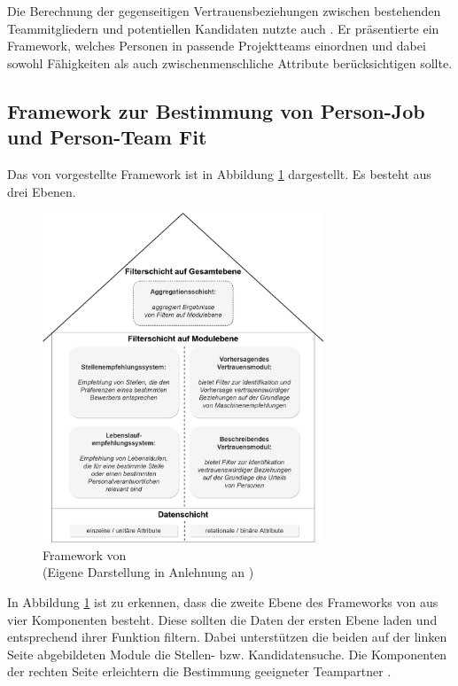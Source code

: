 Die Berechnung der gegenseitigen Vertrauensbeziehungen zwischen bestehenden Teammitgliedern und potentiellen Kandidaten nutzte auch \textcite[S. 1ff.]{keim:2007}. Er präsentierte ein Framework, welches Personen in passende Projektteams einordnen und dabei sowohl Fähigkeiten als auch zwischenmenschliche Attribute berücksichtigen sollte.

\subsection{Framework zur Bestimmung von Person-Job und Person-Team Fit}
\label{ch:verwandteArbeiten:aufDemPEFitBasierendeBilateraleSysteme:pjUndPtFit}
Das von \textcite[S. 1ff.]{keim:2007} vorgestellte Framework ist in Abbildung \ref{fig:verwandteArbeiten:abb3} dargestellt. Es besteht aus drei Ebenen.

\begin{figure}[h]
	\centering
	\includegraphics[width=0.75\textwidth]{gfx/keim-multilayer.jpg}
	\caption{Framework von \textcite[S. 5]{keim:2007}\\
	(Eigene Darstellung in Anlehnung an \cite[S. 5]{keim:2007})}
	\label{fig:verwandteArbeiten:abb3}
\end{figure}

In Abbildung \ref{fig:verwandteArbeiten:abb3} ist zu erkennen, dass die zweite Ebene des Frameworks von \textcite[S. 5ff.]{keim:2007} aus vier Komponenten besteht. Diese sollten die Daten der ersten Ebene laden und entsprechend ihrer Funktion filtern. Dabei unterstützen die beiden auf der linken Seite abgebildeten Module die Stellen- bzw. Kandidatensuche. Die Komponenten der rechten Seite erleichtern die Bestimmung geeigneter Teampartner \cite[S. 5]{keim:2007}.


